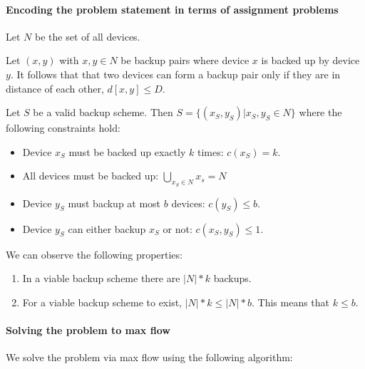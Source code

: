 
\paragraph{Encoding the problem statement in terms of assignment problems}

Let $N$ be the set of all devices.

Let $(x, y)$ with $ x, y \in N$ be backup pairs where device $x$ is backed up by device $y$. It follows that that two devices can form a backup pair only if they are in distance of each other, $d[x, y] \leq D$.

Let $S$ be a valid backup scheme. Then $S = \{(x_S, y_S) | x_S, y_S \in N \}$ where the following constraints hold:

\begin{itemize}

	\item Device $x_S$ must be backed up exactly $k$ times: $c(x_S) = k$.
	
	\item All devices must be backed up: $\bigcup_{x_S \in N} x_s = N $
	
	\item Device $y_S$ must backup at most $b$ devices: $c(y_S) \leq b$.
	
	\item Device $y_S$ can either backup $x_S$ or not: $c(x_S, y_S) \leq 1$.

\end{itemize}

We can observe the following properties:
\begin{enumerate}
	\item In a viable backup scheme there are $|N| * k$ backups.
	
	\item For a viable backup scheme to exist, $|N| *k \leq |N| * b$. This means that $k \leq b$.
\end{enumerate}

\paragraph{Solving the problem to max flow}

We solve the problem via max flow using the following algorithm:
\\


